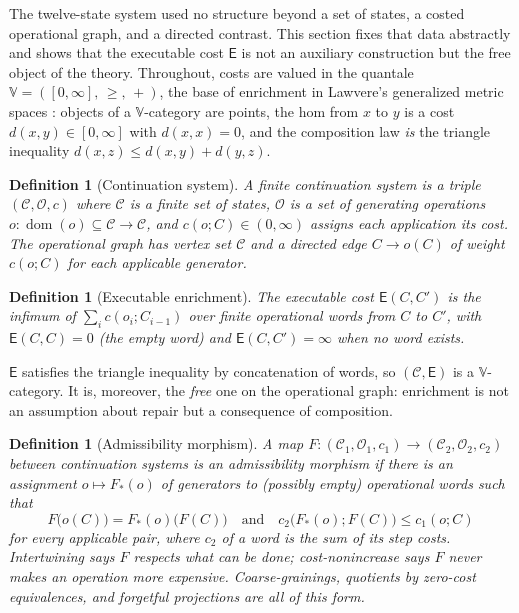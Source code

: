 \documentclass[11pt]{article}
\newtheorem{definition}[theorem]{Definition}
\theoremstyle{remark}
\newcommand{\C}{\mathcal{C}}
\newcommand{\Ops}{\mathcal{O}}
\newcommand{\E}{\mathsf{E}}
\begin{document}
The twelve-state system used no structure beyond a set of states, a
costed operational graph, and a directed contrast. This section fixes
that data abstractly and shows that the executable cost $\E$ is not an
auxiliary construction but the free object of the theory. Throughout,
costs are valued in the quantale
$\mathbb{V} = ([0,\infty],\,\ge,\,+)$, the base of enrichment in
Lawvere's generalized metric spaces \cite{lawvere}: objects of a
$\mathbb{V}$-category are points, the hom from $x$ to $y$ is a cost
$d(x,y)\in[0,\infty]$ with $d(x,x)=0$, and the composition law
\emph{is} the triangle inequality
$d(x,z) \le d(x,y) + d(y,z)$.

\begin{definition}[Continuation system]\label{def:cs}
A \emph{finite continuation system} is a triple $(\C,\Ops,c)$ where
$\C$ is a finite set of states, $\Ops$ is a set of generating
operations $o\colon \operatorname{dom}(o)\subseteq\C \to \C$, and
$c(o;C)\in(0,\infty)$ assigns each application its cost. The
\emph{operational graph} has vertex set $\C$ and a directed edge
$C \to o(C)$ of weight $c(o;C)$ for each applicable generator.
\end{definition}

\begin{definition}[Executable enrichment]\label{def:free}
The \emph{executable cost} $\E(C,C')$ is the infimum of
$\sum_{i} c(o_i;C_{i-1})$ over finite operational words from $C$ to
$C'$, with $\E(C,C)=0$ (the empty word) and $\E(C,C')=\infty$ when no
word exists.
\end{definition}

$\E$ satisfies the triangle inequality by concatenation of words, so
$(\C,\E)$ is a $\mathbb{V}$-category. It is, moreover, the
\emph{free} one on the operational graph: enrichment is not an
assumption about repair but a consequence of composition.

\begin{definition}[Admissibility morphism]\label{def:morphism}
A map $F\colon (\C_1,\Ops_1,c_1) \to (\C_2,\Ops_2,c_2)$ between
continuation systems is an \emph{admissibility morphism} if there is
an assignment $o \mapsto F_{*}(o)$ of generators to (possibly empty)
operational words such that
\[
F\bigl(o(C)\bigr) = F_{*}(o)\bigl(F(C)\bigr)
\quad\text{and}\quad
c_2\bigl(F_{*}(o); F(C)\bigr) \le c_1(o;C)
\]
for every applicable pair, where $c_2$ of a word is the sum of its
step costs. Intertwining says $F$ respects what can be done;
cost-nonincrease says $F$ never makes an operation more expensive.
Coarse-grainings, quotients by zero-cost equivalences, and forgetful
projections are all of this form.
\end{definition}
\end{document}
